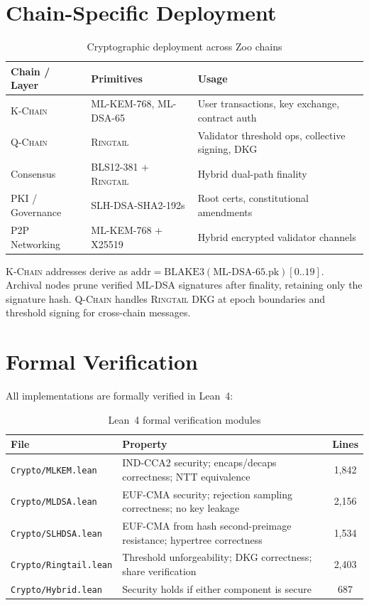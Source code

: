 \documentclass[11pt,letterpaper]{article}
\theoremstyle{definition}
\theoremstyle{remark}
\newcommand{\Ringtail}{\textsc{Ringtail}}
\newcommand{\MLKEM}{\textsc{ML-KEM}}
\newcommand{\MLDSA}{\textsc{ML-DSA}}
\newcommand{\SLHDSA}{\textsc{SLH-DSA}}
\newcommand{\KChain}{\textsc{K-Chain}}
\newcommand{\QChain}{\textsc{Q-Chain}}
\begin{document}
\section{Chain-Specific Deployment}

\begin{table}[h]
\centering
\small
\begin{tabular}{llp{6cm}}
\toprule
\textbf{Chain / Layer} & \textbf{Primitives} & \textbf{Usage} \\
\midrule
\KChain{} & \MLKEM{}-768, \MLDSA{}-65 & User transactions, key exchange, contract auth \\
\QChain{} & \Ringtail{} & Validator threshold ops, collective signing, DKG \\
Consensus & BLS12-381 + \Ringtail{} & Hybrid dual-path finality \cite{zoo-consensus} \\
PKI / Governance & \SLHDSA{}-SHA2-192s & Root certs, constitutional amendments \\
P2P Networking & \MLKEM{}-768 + X25519 & Hybrid encrypted validator channels \\
\bottomrule
\end{tabular}
\caption{Cryptographic deployment across Zoo chains}
\label{tab:chain-crypto}
\end{table}

\KChain{} addresses derive as $\text{addr} = \text{BLAKE3}(\text{ML-DSA-65.pk})[0..19]$. Archival nodes prune verified \MLDSA{} signatures after finality, retaining only the signature hash. \QChain{} handles \Ringtail{} DKG at epoch boundaries and threshold signing for cross-chain messages.

\section{Formal Verification}

All implementations are formally verified in Lean~4:

\begin{table}[h]
\centering
\begin{tabular}{lp{6.5cm}c}
\toprule
\textbf{File} & \textbf{Property} & \textbf{Lines} \\
\midrule
\texttt{Crypto/MLKEM.lean} & IND-CCA2 security; encaps/decaps correctness; NTT equivalence & 1,842 \\
\texttt{Crypto/MLDSA.lean} & EUF-CMA security; rejection sampling correctness; no key leakage & 2,156 \\
\texttt{Crypto/SLHDSA.lean} & EUF-CMA from hash second-preimage resistance; hypertree correctness & 1,534 \\
\texttt{Crypto/Ringtail.lean} & Threshold unforgeability; DKG correctness; share verification & 2,403 \\
\texttt{Crypto/Hybrid.lean} & Security holds if either component is secure & 687 \\
\bottomrule
\end{tabular}
\caption{Lean~4 formal verification modules}
\label{tab:lean-crypto}
\end{table}
\end{document}
